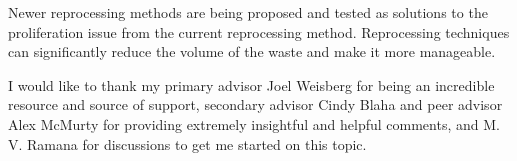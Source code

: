 \documentclass[nofootinbib,preprint,aps]{revtex4-1}
\begin{document}
Newer reprocessing methods are being proposed and tested
as  solutions to the proliferation issue from the current reprocessing method.
 Reprocessing techniques can significantly reduce the volume of the waste and make it more
manageable.

\begin{acknowledgments}
I would like to thank my primary advisor Joel Weisberg for being an incredible resource and
source of support, secondary advisor Cindy Blaha and peer advisor Alex McMurty for providing extremely
insightful and helpful comments, and M. V. Ramana for discussions to get me started on this topic.
\end{acknowledgments}
\newpage


\end{document}
